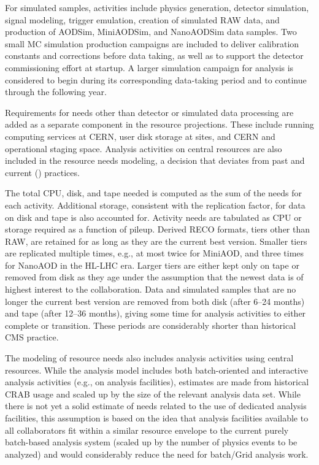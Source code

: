 For simulated samples, activities include physics generation, detector simulation, signal modeling, trigger emulation, creation of simulated \gls{RAW} data, and production of AODSim, MiniAODSim, and NanoAODSim data samples. Two small \gls{MC} simulation production campaigns are included to deliver calibration constants and corrections before data taking, as well as to support the detector commissioning effort at startup. A larger simulation campaign for analysis is considered to begin during its corresponding data-taking period and to continue through the following year. 

Requirements for needs other than detector or simulated data processing are added as a separate component in the resource projections. These include running computing services at CERN, user disk storage at \TierTwo sites, and CERN and operational staging space. Analysis activities on central resources are also included in the resource needs modeling, a decision that deviates from past and current (\PhaseOne) practices.

The total \gls{CPU}, disk, and tape needed is computed as the sum of the needs for each activity. Additional storage, consistent with the replication factor, for data on disk and tape is also accounted for. Activity needs are tabulated as \gls{CPU} or storage required as a function of pileup. Derived \gls{RECO} formats, tiers other than \gls{RAW}, are retained for as long as they are the current best version. Smaller tiers are replicated multiple times, e.g., at most twice for MiniAOD, and three times for NanoAOD in the \gls{HL-LHC} era. Larger tiers are either kept only on tape or removed from disk as they age under the assumption that the newest data is of highest interest to the collaboration. Data and simulated samples that are no longer the current best version are removed from both disk (after 6--24 months) and tape (after 12--36 months), giving some time for analysis activities to either complete or transition. These periods are considerably shorter than historical CMS practice.

The modeling of resource needs also includes analysis activities using central resources. While the \PhaseTwo analysis model includes both batch-oriented and interactive analysis activities (e.g., on analysis facilities), estimates are made from historical CRAB usage and scaled up by the size of the relevant analysis data set. While there is not yet a solid estimate of needs related to the use of dedicated analysis facilities, this assumption is based on the idea that analysis facilities available to all collaborators fit within a similar resource envelope to the current purely batch-based analysis system (scaled up by the number of physics events to be analyzed) and would considerably reduce the need for batch/Grid analysis work.



